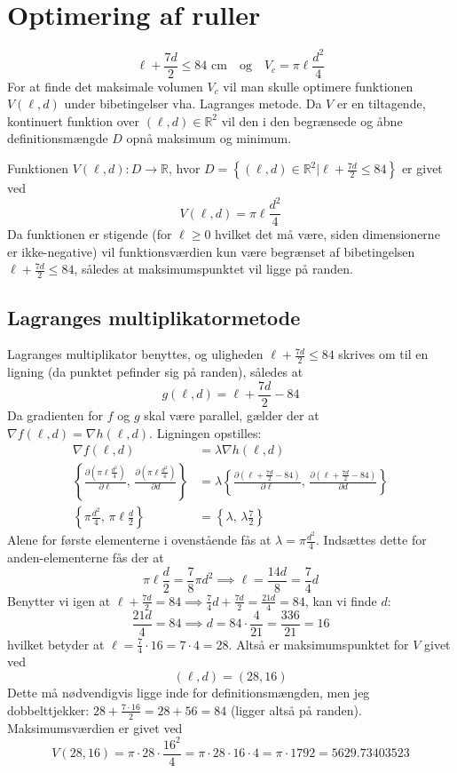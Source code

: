 \documentclass{report}
\begin{document}
\section{Optimering af ruller}
$$\ell+\frac{7d}{2}\leq84\text{ cm}\quad\text{og}\quad V_c=\pi\ell\frac{d^2}{4}$$
For at finde det maksimale volumen $V_c$ vil man skulle optimere funktionen $V(\ell,d)$ under bibetingelser vha. Lagranges metode. Da $V$ er en tiltagende, kontinuert funktion over $(\ell,d)\in\mathbb{R}^2$ vil den i den begrænsede og åbne definitionsmængde $D$ opnå maksimum og minimum.

Funktionen $V(\ell,d):D\to\mathbb{R}$, hvor $D=\left\{(\ell,d)\in\mathbb{R}^2|\ell+\frac{7d}{2}\leq84\right\}$ er givet ved$$V(\ell,d)=\pi\ell\frac{d^2}{4}$$
Da funktionen er stigende (for $\ell\geq0$ hvilket det må være, siden dimensionerne er ikke-negative) vil funktionsværdien kun være begrænset af bibetingelsen $\ell+\frac{7d}{2}\leq84$, således at maksimumspunktet vil ligge på randen. 
\subsection{Lagranges multiplikatormetode}
Lagranges multiplikator benyttes, og uligheden $\ell+\frac{7d}{2}\leq84$ skrives om til en ligning (da punktet pefinder sig på randen), således at $$g(\ell,d)=\ell+\frac{7d}{2}-84$$Da gradienten for $f$ og $g$ skal være parallel, gælder der at $\nabla f(\ell,d)=\nabla h(\ell,d)$. Ligningen opstilles:
\begin{align*}
    \nabla f(\ell,d)&=\lambda\nabla h(\ell,d)\\
    \left\{\frac{\partial \left(\pi\ell\frac{d^2}{4}\right)}{\partial \ell},\,\frac{\partial \left(\pi\ell\frac{d^2}{4}\right)}{\partial d}\right\}&=\lambda\left\{\frac{\partial \left(\ell+\frac{7d}{2}-84\right)}{\partial \ell},\,\frac{\partial \left(\ell+\frac{7d}{2}-84\right)}{\partial d}\right\}\\
    \left\{\pi\frac{d^2}{4},\,\pi\ell\frac{d}{2}\right\}&=\left\{\lambda,\,\lambda\frac{7}{2}\right\}
\end{align*}
Alene for første elementerne i ovenstående fås at $\lambda=\pi\frac{d^2}{4}$. Indsættes dette for anden-elementerne fås der at $$\pi\ell\frac{d}{2}=\frac{7}{8}\pi d^2\implies \ell=\frac{14d}{8}=\frac{7}{4}d$$
Benytter vi igen at $\ell+\frac{7d}{2}=84\implies\frac{7}{4}d+\frac{7d}{2}=\frac{21d}{4}=84$, kan vi finde $d$:$$\frac{21d}{4}=84\implies d=84\cdot\frac{4}{21}=\frac{336}{21}=16$$hvilket betyder at $\ell=\frac{7}{4}\cdot16=7\cdot4=28$. Altså er maksimumspunktet for $V$ givet ved $$(\ell,d)=\left(28,16\right)$$
Dette må nødvendigvis ligge inde for definitionsmængden, men jeg dobbelttjekker: $28+\frac{7\cdot16}{2}=28+56=84$ (ligger altså på randen). Maksimumsværdien er givet ved $$V\left(28,16\right)=\pi\cdot28\cdot\frac{16^2}{4}=\pi\cdot28\cdot16\cdot4=\pi\cdot1792=5629.73403523$$
\end{document}
